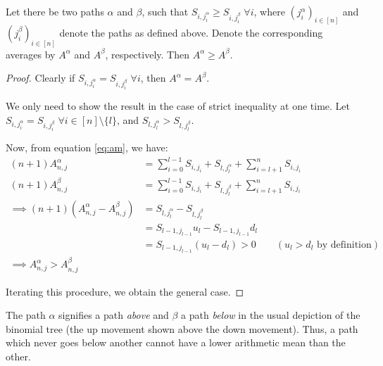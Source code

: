 \begin{thm}
	\label{thm:asian-up-dn-path}
	Let there be two paths $\alpha$ and $\beta$, such that $S_{i,j_i^\alpha} \ge S_{i,j_i^\beta} \; \forall i$, where $ ( j_i^\alpha )_{i \in [n]} $ and $ ( j_i^\beta )_{i \in [n]} $ denote the paths as defined above. Denote the corresponding averages by $A^\alpha$ and $A^\beta$, respectively. Then $ A^\alpha \ge A^\beta $.
\end{thm}

\begin{proof}
	Clearly if $S_{i,j_i^\alpha} = S_{i,j_i^\beta} \; \forall i$, then $A^\alpha = A^\beta$.
	
	We only need to show the result in the case of strict inequality at one time.
	Let $ S_{i,j_i^\alpha} = S_{i,j_i^\beta} \; \forall i \in [n] \setminus \{l\} $, and $ S_{l,j_l^\alpha} > S_{l,j_l^\beta}$.
	
	Now, from equation \ref{eq:am}, we have:
	\begin{align*}
		(n+1) A_{n,j}^\alpha &= \sum_{i=0}^{l-1} S_{i,j_i} + S_{l,j_l^\alpha} + \sum_{i=l+1}^{n} S_{i,j_i} \\
		(n+1) A_{n,j}^\beta &= \sum_{i=0}^{l-1} S_{i,j_i} + S_{l,j_l^\beta} + \sum_{i=l+1}^{n} S_{i,j_i} \\
		\implies (n+1) \left(A_{n,j}^\alpha - A_{n,j}^\beta\right) &= S_{l,j_l^\alpha} - S_{l,j_l^\beta} \\
												 &= S_{l-1,j_{l-1}} u_l - S_{l-1,j_{l-1}} d_l \\
												 &= S_{l-1,j_{l-1}} (u_l - d_l) > 0 \qquad (u_l > d_l \text{ by definition}) \\
		\implies A_{n,j}^\alpha > A_{n,j}^\beta
	\end{align*}
	
	Iterating this procedure, we obtain the general case.
\end{proof}


\begin{rem}
	The path $\alpha$ signifies a path \emph{above} and $\beta$ a path \emph{below} in the usual depiction of the binomial tree (the up movement shown above the down movement). Thus, a path which never goes below another cannot have a lower arithmetic mean than the other.
\end{rem}


